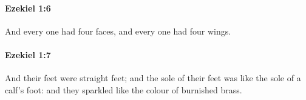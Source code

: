 		\paragraph{Ezekiel 1:6} %
			\label{EZEKIEL-1-6}

			And every one had four faces, and every one had four wings.


		\paragraph{Ezekiel 1:7} %
			\label{EZEKIEL-1-7}

			And their feet were straight feet; and the sole of their feet was like the sole of a calf’s foot: and they sparkled like the colour of burnished brass.


